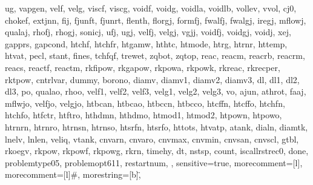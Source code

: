 {{  ug,
  vapgen,
  velf,
  velg,
  viscf,
  viscg,
  voidf,
  voidg,
  voidla,
  voidlb,
  vollev,
  vvol,
  cj0,
  chokef,
  extjnn,
  fij,
  fjunft,
  fjunrt,
  flenth,
  florgj,
  formfj,
  fwalfj,
  fwalgj,
  iregj,
  mflowj,
  qualaj,
  rhofj,
  rhogj,
  sonicj,
  ufj,
  ugj,
  velfj,
  velgj,
  vgjj,
  voidfj,
  voidgj,
  voidj,
  xej,
  gapprs,
  gapcond,
  htchf,
  htchfr,
  htgamw,
  hthtc,
  htmode,
  htrg,
  htrnr,
  httemp,
  htvat,
  pecl,
  stant,
  fines,
  tchfqf,
  trewet,
  zqbot,
  zqtop,
  reac,
  reacm,
  reacrb,
  reacrm,
  reacs,
  reactf,
  reactm,
  rkfipow,
  rkgapow,
  rkpowa,
  rkpowk,
  rkreac,
  rkrecper,
  rktpow,
  cntrlvar,
  dummy,
  borono,
  diamv,
  diamv1,
  diamv2,
  diamv3,
  dl,
  dl1,
  dl2,
  dl3,
  po,
  qualao,
  rhoo,
  velf1,
  velf2,
  velf3,
  velg1,
  velg2,
  velg3,
  vo,
  ajun,
  athrot,
  faaj,
  mflwjo,
  velfjo,
  velgjo,
  htbcan,
  htbcao,
  htbccn,
  htbcco,
  htcffn,
  htcffo,
  htchfn,
  htchfo,
  htfctr,
  htftro,
  hthdmn,
  hthdmo,
  htmod1,
  htmod2,
  htpown,
  htpowo,
  htrnrn,
  htrnro,
  htrnsn,
  htrnso,
  htsrfn,
  htsrfo,
  httots,
  htvatp,
  atank,
  dialn,
  diamtk,
  lnelv,
  lnlen,
  veliq,
  vtank,
  cnvarn,
  cnvaro,
  cnvmax,
  cnvmin,
  cnvsan,
  cnvscl,
  gtbl,
  rkoegv,
  rkpow,
  rkpowf,
  rkpowg,
  rkrn,
  timehy,
  dt,
  nstsp,
  count,
  iscallrstrec0,
  done,
  problemtype05,
  problemopt611,
  restartnum,
},
sensitive=true,
morecomment=[l]{\*},
morecomment=[l]{\#},
morestring=[b]\",
}





